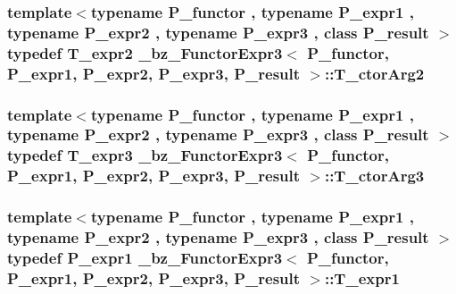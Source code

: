 \subsubsection[{T\+\_\+ctor\+Arg2}]{\setlength{\rightskip}{0pt plus 5cm}template$<$typename P\+\_\+functor , typename P\+\_\+expr1 , typename P\+\_\+expr2 , typename P\+\_\+expr3 , class P\+\_\+result $>$ typedef {\bf T\+\_\+expr2} {\bf \+\_\+bz\+\_\+\+Functor\+Expr3}$<$ P\+\_\+functor, P\+\_\+expr1, P\+\_\+expr2, P\+\_\+expr3, P\+\_\+result $>$\+::{\bf T\+\_\+ctor\+Arg2}}\label{class__bz__FunctorExpr3_acd52287918ba75a58a5e8da2a3ff9dc6}
\hypertarget{class__bz__FunctorExpr3_ad40b642cbb626e49760e8f99073ee636}{}
\subsubsection[{T\+\_\+ctor\+Arg3}]{\setlength{\rightskip}{0pt plus 5cm}template$<$typename P\+\_\+functor , typename P\+\_\+expr1 , typename P\+\_\+expr2 , typename P\+\_\+expr3 , class P\+\_\+result $>$ typedef {\bf T\+\_\+expr3} {\bf \+\_\+bz\+\_\+\+Functor\+Expr3}$<$ P\+\_\+functor, P\+\_\+expr1, P\+\_\+expr2, P\+\_\+expr3, P\+\_\+result $>$\+::{\bf T\+\_\+ctor\+Arg3}}\label{class__bz__FunctorExpr3_ad40b642cbb626e49760e8f99073ee636}
\hypertarget{class__bz__FunctorExpr3_a39963d1b65dfb09899113c1bcd23aad2}{}
\subsubsection[{T\+\_\+expr1}]{\setlength{\rightskip}{0pt plus 5cm}template$<$typename P\+\_\+functor , typename P\+\_\+expr1 , typename P\+\_\+expr2 , typename P\+\_\+expr3 , class P\+\_\+result $>$ typedef P\+\_\+expr1 {\bf \+\_\+bz\+\_\+\+Functor\+Expr3}$<$ P\+\_\+functor, P\+\_\+expr1, P\+\_\+expr2, P\+\_\+expr3, P\+\_\+result $>$\+::{\bf T\+\_\+expr1}}\label{class__bz__FunctorExpr3_a39963d1b65dfb09899113c1bcd23aad2}
\hypertarget{class__bz__FunctorExpr3_a942c2f518fa860c92819e1fc7a916511}{}
